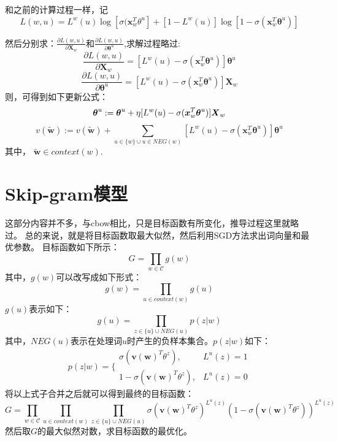 和之前的计算过程一样，记
\begin{equation}
    L(w,u) = L^w(u)\log[\sigma(\boldsymbol{x}_w^T \theta^u] + [1-L^w(u)]\log [1-\sigma(\boldsymbol{x}_w^T \boldsymbol{\theta}^u)]
\end{equation}

然后分别求：$\frac{\partial L(w,u)}{\partial\boldsymbol{X}_w}$和$\frac{\partial L(w,u)}{\partial\boldsymbol{\theta}^u}$,求解过程略过:
\begin{equation}
    \frac{\partial L(w,u)}{\partial\boldsymbol{X}_w} = [L^w(u)-\sigma(\boldsymbol{x}_w^T \boldsymbol{\theta}^u)]\boldsymbol{\theta}^u 
\end{equation}
\begin{equation}
    \frac{\partial L(w,u)}{\partial\boldsymbol{\theta}^u} = [L^w(u)-\sigma(\boldsymbol{x}_w^T \boldsymbol{\theta}^u)]\boldsymbol{X}_w
\end{equation}
则，可得到如下更新公式：
\begin{equation}
    \boldsymbol{\theta}^u:=\boldsymbol{\theta}^u+\eta [L^w(u)-\sigma(\boldsymbol{x}_w^T \boldsymbol{\theta}^u)]\boldsymbol{X}_w \\
\end{equation}
\begin{equation}
    v(\boldsymbol{\widetilde{w}}):=v(\boldsymbol{\widetilde{w}}) + \sum_{u \in \{w\} \cup u \in NEG(w)} [L^w(u)-\sigma(\boldsymbol{x}_w^T \boldsymbol{\theta}^u)]\boldsymbol{\theta}^u
\end{equation}
其中， $\boldsymbol{\widetilde{w}} \in context(w)$.

\section{Skip-gram模型}
这部分内容并不多，与cbow相比，只是目标函数有所变化，推导过程这里就略过。
总的来说，就是将目标函数取最大似然，然后利用SGD方法求出词向量和最优参数。
目标函数如下所示：
\begin{equation}
    G = \prod_{w \in \mathcal{C}} g(w)
\end{equation}
其中，$g(w)$可以改写成如下形式：
\begin{equation}
    g(w)=\prod_{u \in context(w)} g(u)
\end{equation}
$g(u)$表示如下：
\begin{equation}
    g(u) = \prod_{z \in \{u\} \cup NEG(u)} p(z|w)
\end{equation}
其中，$NEG(u)$表示在处理词$u$时产生的负样本集合。$p(z|w)$如下：
\begin{equation}
    p(z|w) = \Bigg \{ \begin{array}{ll}
    \sigma(\boldsymbol{v(w)}^T \theta^z), & L^u(z) = 1\\
    1-\sigma(\boldsymbol{v(w)}^T \theta^z), & L^u(z) = 0
    \end{array}
\end{equation}
将以上式子合并之后就可以得到最终的目标函数：
\begin{equation}
    G = \prod_{w \in \mathcal{C}}\prod_{u \in context(w)}\prod_{z \in \{u\} \cup NEG(u)} \sigma(\boldsymbol{v(w)}^T \theta^z)^{L^u(z)}(1-\sigma(\boldsymbol{v(w)}^T \theta^z))^{L^u(z)}
\end{equation}
然后取$G$的最大似然对数，求目标函数的最优化。

 